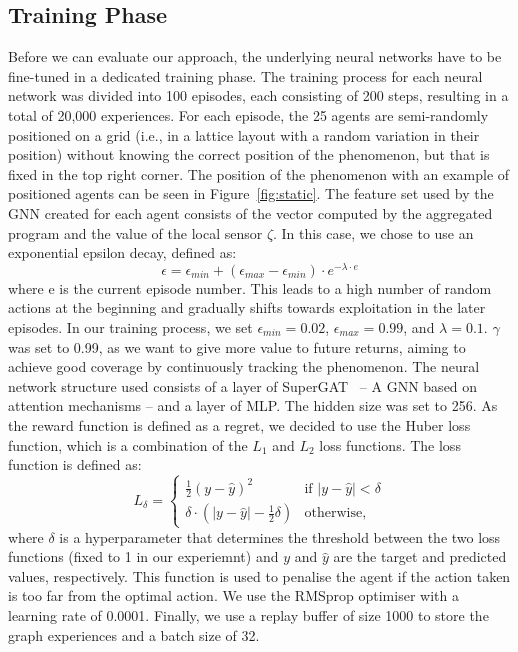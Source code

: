 \documentclass[conference]{IEEEtran}
\begin{document}
\subsection{Training Phase}
Before we can evaluate our approach, the underlying neural networks have to be fine-tuned in a dedicated training phase.
The training process for each neural network was divided into 100 episodes, each consisting of 200 steps, resulting in a total of 20,000 experiences.
%
For each episode, 
 the 25 agents are semi-randomly positioned on a grid (i.e., in a lattice layout with a random variation in their position) without knowing the correct position of the phenomenon, 
 but that is fixed in the top right corner. The position of the phenomenon with an example of positioned agents can be seen in Figure~\ref{fig:static}. 
 The feature set used by the \ac{GNN} created for each agent consists of the vector computed by the aggregated program and the value of the local sensor $\zeta$.
%
In this case, we chose to use an exponential epsilon decay, defined as:
\begin{equation*}
\epsilon = \epsilon_{min} + (\epsilon_{max} - \epsilon_{min}) \cdot e^{-\lambda \cdot e}
\end{equation*}
where e is the current episode number. 
This leads to a high number of random actions at the beginning and gradually shifts towards exploitation in the later episodes. 
%
In our training process, 
 we set $\epsilon_{min} = 0.02$, $\epsilon_{max} = 0.99$, and $\lambda = 0.1$.
$\gamma$ was set to 0.99, 
 as we want to give more value to future returns, 
 aiming to achieve good coverage by continuously tracking the phenomenon. 
The neural network structure used consists of a layer of SuperGAT~\cite{DBLP:journals/corr/abs-2204-04879} -- A \ac{GNN} based on attention mechanisms -- and a layer of MLP. 
The hidden size was set to 256.
%
As the reward function is defined as a regret, 
 we decided to use the Huber loss function, %
 which is a combination of the $L_1$ and $L_2$ loss functions.
%
The loss function is defined as:
\begin{equation*}
L_\delta = \begin{cases}
  \frac{1}{2} (y - \hat{y})^2 & \text{if } |y - \hat{y}| < \delta \\
  \delta \cdot (|y - \hat{y}| - \frac{1}{2} \delta) & \text{otherwise,} 
 \end{cases}
\end{equation*}
where $\delta$ is a hyperparameter that determines the threshold between the two loss functions (fixed to 1 in our experiemnt) and $y$ and $\hat{y}$ are the target and predicted values, respectively.
This function is used to penalise the agent if the action taken is too far from the optimal action. 
%
We use the RMSprop optimiser with a learning rate of 0.0001.
%
Finally, we use a replay buffer of size 1000 to store the graph experiences and a batch size of 32.
\end{document}
